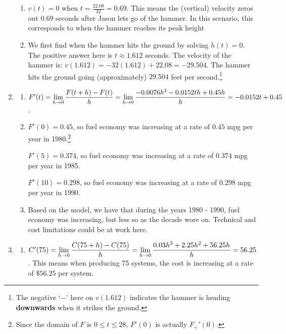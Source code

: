 \documentclass{ximera}
\begin{document}
\begin{enumerate}
\begin{enumerate}
\item  $v(t) = 0$  when $t = \frac{22.08}{32} = 0.69$.  This means the (vertical) velocity zeros out $0.69$ seconds after Jason lets go of the hammer.  In this scenario, this corresponds to when the hammer reaches its peak height

\item  We first find when the hammer hits the ground by solving $h(t) = 0$.  The positive answer here is   $t \approx 1.612$ seconds.  The velocity of the hammer is:  $v(1.612) = -32(1.612) + 22.08 = -29.504$.  The hammer hits the ground going (approximately) $29.504$ feet per second.\footnote{The negative `$-$' here on $v(1.612)$ indicates the hammer is heading \textbf{downwards} when it strikes the ground.}

\end{enumerate}

\item  \begin{enumerate}  \item  $F'(t) = \ds{\lim_{h \rightarrow 0} \dfrac{F(t + h) - F(t)}{h} = \lim_{h \rightarrow 0} \dfrac{-0.0076h^{2} -0.0152th+0.45h}{h} =-0.0152t + 0.45}$.

\item   $F'(0) = 0.45$, so fuel economy was increasing at a rate of $0.45$ mpg per year in 1980.\footnote{Since the domain of $F$ is $0 \leq t \leq 28$, $F'(0)$ is actually $F_{+}'(0)$.}

\smallskip

 $F'(5) = 0.374$,  so fuel economy was increasing at a rate of $0.374$ mpg per year in 1985. 
 
 \smallskip
 
  $F'(10) = 0.298$,  so fuel economy was increasing at a rate of $0.298$ mpg  per year in 1990. 

\item  Based on the model, we have that during the years 1980 - 1990, fuel economy was increasing, but less so as the decade wore on.  Technical and cost limitations could be at work here.

\end{enumerate}

\item   \begin{enumerate}  \item   $C'(75) = \ds{\lim_{h \rightarrow 0} \dfrac{C(75+h) - C(75)}{h}  =     \lim_{h \rightarrow 0} \dfrac{0.03h^{3}+2.25h^{2}+56.25h}{h} = 56.25}$.  This means when producing 75 systems, the cost is increasing at a rate of $\$ 56.25$ per system.


\end{enumerate}
\end{enumerate}
\end{document}
